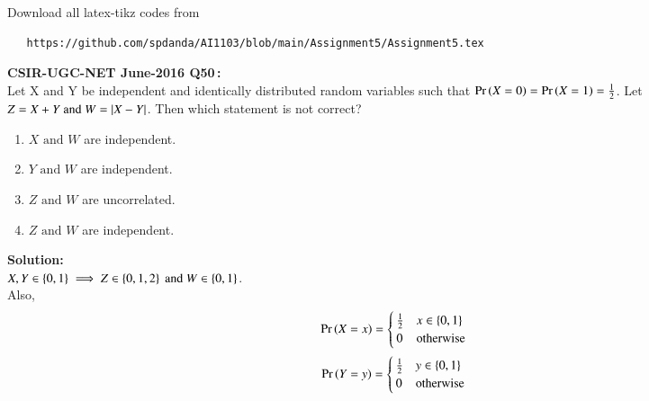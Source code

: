\documentclass[journal,12pt,twocolumn]{IEEEtran}
\begin{document}
\maketitle
\newpage
\bigskip
\renewcommand{\thefigure}{\theenumi}
\renewcommand{\thetable}{\theenumi}
Download all latex-tikz codes from
\begin{lstlisting}
   https://github.com/spdanda/AI1103/blob/main/Assignment5/Assignment5.tex
\end{lstlisting}
\large\textbf{CSIR-UGC-NET June-2016 Q50\,:}\\
 Let X and Y be independent and identically distributed random variables such that \(\Pr\left(X=0\right)=\Pr\left(X=1\right)= \frac{1}{2}\). Let \(Z = X+Y \text{ and } W = \vert X-Y\vert\). Then which statement is not correct?
 \begin{enumerate}
     \item $X \text{ and } W$ are independent.
     \item $Y \text{ and } W$ are independent.
     \item $Z \text{ and } W$ are uncorrelated.
     \item $Z \text{ and } W$ are independent.
 \end{enumerate}
 \textbf{Solution:}\\
 $X, Y \in \left\{0,1\right\}\implies Z \in \left\{0,1,2\right\} \text{ and } W \in \left\{0,1\right\}$.\\
 Also,
 \begin{equation}
         \Pr\left(X=x\right) = 
     \begin{cases}
      \frac{1}{2} & x \in \left\{0,1\right\}\\
      0 & \text{otherwise}
     \end{cases}
 \end{equation}
  \begin{equation}
         \Pr\left(Y=y\right) = 
     \begin{cases}
      \frac{1}{2} & y \in \left\{0,1\right\}\\
      0 & \text{otherwise}
     \end{cases}
 \end{equation}
\end{document}
